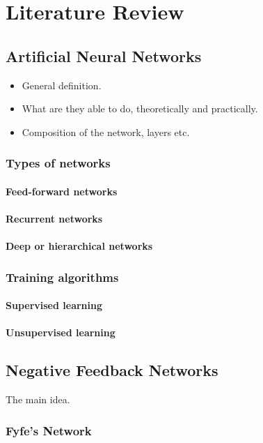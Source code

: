 \documentclass[11pt,a4paper]{report}
\begin{document}
	
	\chapter{Literature Review}
		\section{Artificial Neural Networks}
		\begin{itemize}
			\item General definition.
			\item What are they able to do, theoretically and practically.
			\item Composition of the network, layers etc.
		\end{itemize}
		
			\subsection{Types of networks}
				\subsubsection{Feed-forward networks}
				\subsubsection{Recurrent networks}
				\subsubsection{Deep or hierarchical networks}
		
			\subsection{Training algorithms}
				\subsubsection{Supervised learning}
				\subsubsection{Unsupervised learning}
		
		\section{Negative Feedback Networks}
		The main idea.
			\subsection{Fyfe's Network}
\end{document}
